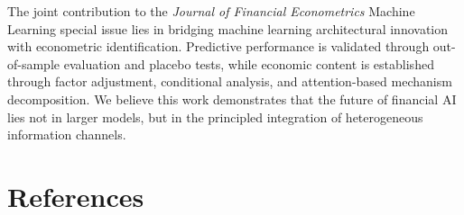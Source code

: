 \documentclass[
  11pt,
  a4paper,
]{article}
\begin{document}
The joint contribution to the \emph{Journal of Financial Econometrics}
Machine Learning special issue lies in bridging machine learning
architectural innovation with econometric identification. Predictive
performance is validated through out-of-sample evaluation and placebo
tests, while economic content is established through factor adjustment,
conditional analysis, and attention-based mechanism decomposition. We
believe this work demonstrates that the future of financial AI lies not
in larger models, but in the principled integration of heterogeneous
information channels.

\section*{References}\label{references}
\end{document}
